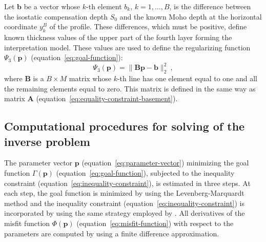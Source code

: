 \documentclass[manuscript]{geophysics}
\begin{document}
Let $\mathbf{b}$ be a vector whose $k$-th element $b_{k}$,
$k = 1, \dots, B$, is the difference between the isostatic compensation depth
$S_{0}$ and the known Moho depth at the horizontal coordinate $y^{B}_{k}$ of the
profile. These differences, which must be positive, define known thickness values
of the upper part of the fourth layer forming the interpretation model.
These values are used to define the 
regularizing function $\Psi_{3}(\mathbf{p})$ (equation~\ref{eq:goal-function}):
\begin{equation}
\Psi_{3}(\mathbf{p}) = \| \mathbf{B}\mathbf{p} - \mathbf{b} \|_{2}^{2} \: ,
\label{eq:equality-constraint-moho}
\end{equation}
where $\mathbf{B}$ is a $B \times M$ matrix whose $k$-th line has one element 
equal to one and all the remaining elements equal to zero. This matrix is defined 
in the same way as matrix $\mathbf{A}$ (equation~\ref{eq:equality-constraint-basement}).


\subsection{Computational procedures for solving of the inverse problem}

The parameter vector $\mathbf{p}$ (equation~\ref{eq:parameter-vector}) minimizing the
goal function $\Gamma (\mathbf{p})$ (equation~\ref{eq:goal-function}), subjected to
the inequality constraint (equation~\ref{eq:inequality-constraint}), is estimated 
in three steps. At each step, the goal function is minimized by using the Levenberg-Marquardt 
method \citep{aster-etal2005} and the inequality constraint 
(equation~\ref{eq:inequality-constraint}) is incorporated by using the same strategy 
employed by \citet{barbosa-etal1999}.
All derivatives of the misfit function $\Phi(\mathbf{p})$ (equation~\ref{eq:misfit-function})
with respect to the parameters are computed by using a finite difference approximation.
\end{document}
